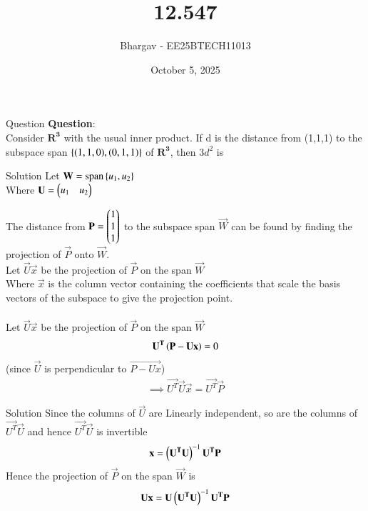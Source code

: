 \documentclass{beamer}
\title{12.547}
\date{October 5, 2025}
\author{Bhargav - EE25BTECH11013}
\begin{document}
\frame{\titlepage}

\begin{frame}{Question}
\textbf{Question}: \\
Consider $\mathbf{R^3}$ with the usual inner product. If d  is the distance from (1,1,1) to the subspace span $\left\{(1,1,0), (0,1,1)\right\}$ of $\mathbf{R^3}$, then $3d^2$ is
\end{frame}
\begin{frame}{Solution}
Let
$\mathbf{W} = \operatorname{span}\left\{u_1, u_2\right\}$\\
Where $\mathbf{U} = \begin{pmatrix}u_1 & u_2\end{pmatrix}$ 

The distance from $\mathbf{P} = \begin{pmatrix}1 \\ 1 \\ 1\end{pmatrix}$ to the subspace span $\vec{W}$ can be found by finding the projection of $\vec{P}$ onto $\vec{W}$.\\

Let $\vec{U}\vec{x}$ be the projection of $\vec{P}$ on the span $\vec{W}$\\
Where $\vec{x}$ is the column vector containing the coefficients that scale the basis vectors of the subspace to give the projection point. \\ \\
Let $\vec{U}\vec{x}$ be the projection of $\vec{P}$ on the span $\vec{W}$
\begin{align}
\mathbf{U^T}\left(\mathbf{P-Ux}\right)=0
\end{align}
(since $\vec{U}$ is perpendicular to $\vec{P-Ux}$)
\begin{align}
\implies \vec{U^T}\vec{U}\vec{x} = \vec{U^T}\vec{P}
\end{align}
\end{frame}

\begin{frame}{Solution}
Since the columns of $\vec{U}$ are Linearly independent, so are the columns of $\vec{U^T}\vec{U}$ and hence $\vec{U^T}\vec{U}$ is invertible 
\begin{align}
\mathbf{x} = \left(\mathbf{U^T}\mathbf{U}\right)^{-1} \mathbf{U^T}\mathbf{P}
\end{align}
Hence the projection of $\vec{P}$ on the span $\vec{W}$ is
\begin{align}
\mathbf{U}\mathbf{x} = \mathbf{U}\left(\mathbf{U^T}\mathbf{U}\right)^{-1} \mathbf{U^T}\mathbf{P}
\end{align}
\end{frame}
\end{document}
